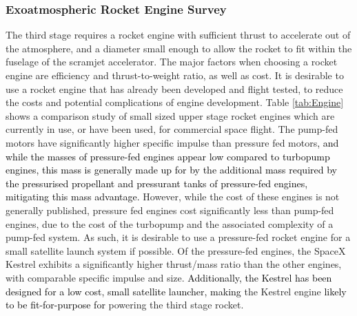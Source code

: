 		\subsubsection{Exoatmospheric Rocket Engine Survey}
		The third stage requires a rocket engine with sufficient thrust to accelerate out of the atmosphere, and a diameter small enough to allow the rocket to fit within the fuselage of the scramjet accelerator. The major factors when choosing a rocket engine are efficiency and thrust-to-weight ratio, as well as cost. It is desirable to use a rocket engine that has already been developed and flight tested, to reduce the costs and potential complications of engine development. Table \ref{tab:Engine} shows a comparison study of small sized upper stage rocket engines which are currently in use, or have been used, for commercial space flight. The pump-fed motors have significantly higher specific impulse than pressure fed motors\textcolor{black}{, and while the masses of pressure-fed engines appear low compared to turbopump engines, this mass is generally made up for by the additional mass required by the pressurised propellant and pressurant tanks of pressure-fed engines, mitigating this mass advantage.} However, while the cost of these engines is not generally published, pressure fed engines cost significantly less than pump-fed engines, due to the cost of the turbopump and the associated complexity of a pump-fed system.  As such, it is desirable to use a pressure-fed rocket engine for a small satellite launch system if possible. Of the pressure-fed engines, the SpaceX Kestrel\cite{Vehicle2008} exhibits a significantly higher thrust/mass ratio than the other engines, with comparable specific impulse and size. \textcolor{black}{Additionally, the Kestrel has been designed for a low cost, small satellite launcher, making} the Kestrel engine \textcolor{black}{likely to be fit-for-purpose for} powering the third stage rocket.  
